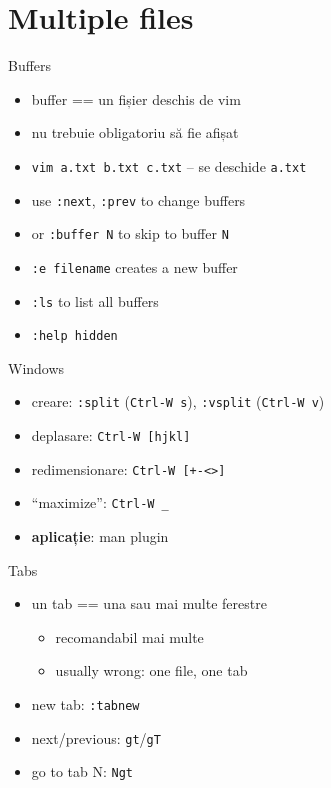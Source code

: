 \documentclass{beamer}
\begin{document}
\section{Multiple files}

\begin{frame}{Buffers}
  \begin{itemize}
    \item buffer == un fișier deschis de vim
    \item nu trebuie obligatoriu să fie afișat
    \item \texttt{vim a.txt b.txt c.txt} -- se deschide \texttt{a.txt}
    \item use \texttt{:next}, \texttt{:prev} to change buffers
    \item or \texttt{:buffer N} to skip to buffer \texttt{N}
    \item \texttt{:e filename} creates a new buffer
    \item \texttt{:ls} to list all buffers
    \item \texttt{:help hidden}
  \end{itemize}
\end{frame}

\begin{frame}{Windows}
  \begin{itemize}
    \item creare: \texttt{:split} (\texttt{Ctrl-W s}), \texttt{:vsplit}
    (\texttt{Ctrl-W v})
    \item deplasare: \texttt{Ctrl-W [hjkl]}
    \item redimensionare: \texttt{Ctrl-W [+-<>]}
    \item ``maximize'': \texttt{Ctrl-W \_}
    \pause
    \item \textbf{aplicație}: man plugin
  \end{itemize}
\end{frame}

\begin{frame}{Tabs}
  \begin{itemize}
    \item un tab == una sau mai multe ferestre
    \pause
    \begin{itemize}
      \item recomandabil mai multe
      \item usually wrong: one file, one tab
    \end{itemize}
    \pause
    \item new tab: \texttt{:tabnew}
    \item next/previous: \texttt{gt}/\texttt{gT}
    \item go to tab N: \texttt{Ngt}
  \end{itemize}
\end{frame}
\end{document}
